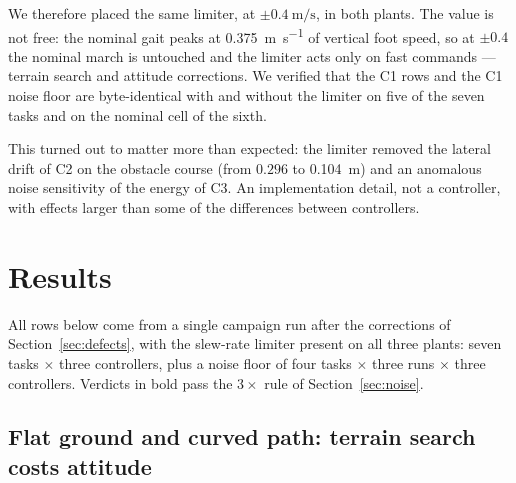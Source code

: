 \documentclass[11pt,a4paper]{article}
\newcommand{\Co}{\textsf{C1}}
\newcommand{\Ct}{\textsf{C2}}
\newcommand{\Cth}{\textsf{C3}}
\begin{document}
We therefore placed the same limiter, at
$\pm\SI{0.4}{\meter\per\second}$, in both plants. The value is not free: the
nominal gait peaks at \SI{0.375}{\meter\per\second} of vertical foot speed, so
at $\pm0.4$ the nominal march is untouched and the limiter acts only on fast
commands --- terrain search and attitude corrections. We verified that the
\Co{} rows and the \Co{} noise floor are byte-identical with and without the
limiter on five of the seven tasks and on the nominal cell of the sixth.

This turned out to matter more than expected: the limiter removed the lateral
drift of \Ct{} on the obstacle course (from $0.296$ to \SI{0.104}{\meter}) and
an anomalous noise sensitivity of the energy of \Cth{}. An implementation
detail, not a controller, with effects larger than some of the differences
between controllers.

\section{Results}
\label{sec:results}

All rows below come from a single campaign run after the corrections of
Section~\ref{sec:defects}, with the slew-rate limiter present on all three
plants: seven tasks $\times$ three controllers, plus a noise floor of four
tasks $\times$ three runs $\times$ three controllers. Verdicts in bold pass
the $3\times$ rule of Section~\ref{sec:noise}.

\subsection{Flat ground and curved path: terrain search costs attitude}
\end{document}
